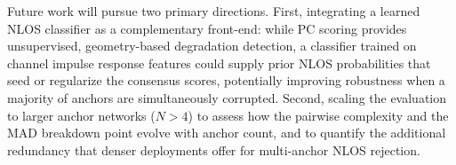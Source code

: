 \documentclass[journal]{IEEEtran}
\begin{document}
Future work will pursue two primary directions. First, integrating a learned NLOS classifier as a complementary front-end: while PC scoring provides unsupervised, geometry-based degradation detection, a classifier trained on channel impulse response features could supply prior NLOS probabilities that seed or regularize the consensus scores, potentially improving robustness when a majority of anchors are simultaneously corrupted. Second, scaling the evaluation to larger anchor networks ($N > 4$) to assess how the pairwise complexity and the MAD breakdown point evolve with anchor count, and to quantify the additional redundancy that denser deployments offer for multi-anchor NLOS rejection.


\end{document}
